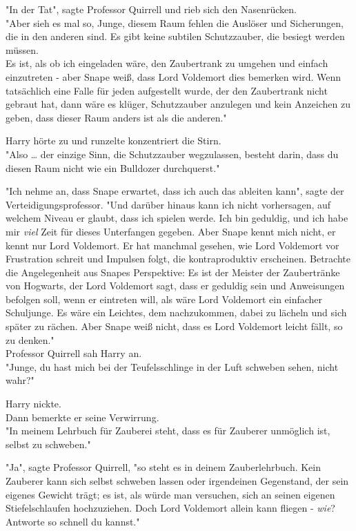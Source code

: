 {"In der Tat", sagte Professor Quirrell und rieb sich den Nasenrücken.\\ "Aber sieh es mal so, Junge, diesem Raum fehlen die Auslöser und Sicherungen, die in den anderen sind. Es gibt keine subtilen Schutzzauber, die besiegt werden müssen.\\ Es ist, als ob ich eingeladen wäre, den Zaubertrank zu umgehen und einfach einzutreten - aber Snape weiß, dass Lord Voldemort dies bemerken wird. Wenn tatsächlich eine Falle für jeden aufgestellt wurde, der den Zaubertrank nicht gebraut hat, dann wäre es klüger, Schutzzauber anzulegen und kein Anzeichen zu geben, dass dieser Raum anders ist als die anderen."

Harry hörte zu und runzelte konzentriert die Stirn.\\ "Also … der einzige Sinn, die Schutzzauber wegzulassen, besteht darin, dass du diesen Raum nicht wie ein Bulldozer durchquerst."

"Ich nehme an, dass Snape erwartet, dass ich auch das ableiten kann", sagte der Verteidigungsprofessor. "Und darüber hinaus kann ich nicht vorhersagen, auf welchem Niveau er glaubt, dass ich spielen werde. Ich bin geduldig, und ich habe mir \emph{viel} Zeit für dieses Unterfangen gegeben. Aber Snape kennt mich nicht, er kennt nur Lord Voldemort. Er hat manchmal gesehen, wie Lord Voldemort vor Frustration schreit und Impulsen folgt, die kontraproduktiv erscheinen. Betrachte die Angelegenheit aus Snapes Perspektive: Es ist der Meister der Zaubertränke von Hogwarts, der Lord Voldemort sagt, dass er geduldig sein und Anweisungen befolgen soll, wenn er eintreten will, als wäre Lord Voldemort ein einfacher Schuljunge. Es wäre ein Leichtes, dem nachzukommen, dabei zu lächeln und sich später zu rächen. Aber Snape weiß nicht, dass es Lord Voldemort leicht fällt, so zu denken."\\ Professor Quirrell sah Harry an.\\ "Junge, du hast mich bei der Teufelsschlinge in der Luft schweben sehen, nicht wahr?"

Harry nickte.\\ Dann bemerkte er seine Verwirrung.\\ "In meinem Lehrbuch für Zauberei steht, dass es für Zauberer unmöglich ist, selbst zu schweben."

"Ja", sagte Professor Quirrell, "so steht es in deinem Zauberlehrbuch. Kein Zauberer kann sich selbst schweben lassen oder irgendeinen Gegenstand, der sein eigenes Gewicht trägt; es ist, als würde man versuchen, sich an seinen eigenen Stiefelschlaufen hochzuziehen. Doch Lord Voldemort allein kann fliegen - \emph{wie}? Antworte so schnell du kannst."

}
